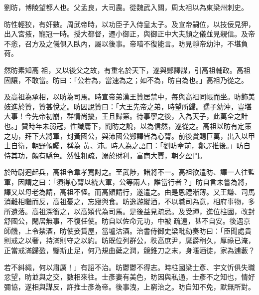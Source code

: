 
\begin{pinyinscope}

 劉昉，博陵望都人也。父孟良，大司農。從魏武入關，周太祖以為東梁州刺史。



 昉性輕狡，有奸數。周武帝時，以功臣子入侍皇太子。及宣帝嗣位，以技佞見狎，出入宮掖，寵冠一時。授大都督，遷小御正，與御正中大夫顏之儀並見親信。及帝不悆，召方及之儀俱入臥內，屬以後事。帝喑不復能言。昉見靜帝幼沖，不堪負荷。



 然昉素知高
 祖，又以後父之故，有重名於天下，遂與鄭譯謀，引高祖輔政。高祖固讓，不敢當。昉曰：「公若為，當速為之；如不為，昉自為也。」高祖乃從之。



 及高祖為承相，以昉為司馬。時宣帝弟漢王贊居禁中，每與高祖同帳而坐。昉飾美妓進於贊，贊甚悅之。昉因說贊曰：「大王先帝之弟，時望所歸。孺子幼沖，豈堪大事！今先帝初崩，群情尚擾，王且歸第。待事寧之後，入為天子，此萬全之計也。」贊時年未弱冠，性識庸下，聞昉之說，以為信然，遂從之。高祖以昉有定策之功，拜下大將軍，封黃國公，與沛國公鄭譯皆為心膂。前後賞賜巨萬，出入以甲士自衛，朝野傾矚，稱為
 黃、沛。時人為之語曰：「劉昉牽前，鄭譯推後。」昉自恃其功，頗有驕色。然性粗疏，溺於財利，富商大賈，朝夕盈門。



 於時尉迥起兵，高祖令韋孝寬討之。至武陟，諸將不一。高祖欲遣昉、譯一人往監軍，因謂之曰：「須得心膂以統大軍，公等兩人，誰當行者？」昉自言未嘗為將，譯又以母老為請，高祖不怪。而高熲請行，遂遣之。由是恩禮漸薄。又王謙、司馬消難相繼而反，高祖憂之，忘寢與食。昉逸游縱酒，不以職司為意，相府事物，多所遺落。高祖深銜之，以高熲代為司馬。是後益見疏忌。及受禪，進位柱國，改封舒國公，閑居無事，不復任使。昉自以佐命元功，中被
 疏遠，甚不自安。後遇京師饑，上令禁酒，昉使妾賃屋，當壚沽酒。治書侍御史梁毗劾奏昉曰：「臣聞處貴則戒之以奢，持滿則守之以約。昉既位列群公，秩高庶尹，縻爵稍久，厚祿已淹，正當戒滿歸盈，鑒斯止足，何乃規曲蘗之潤，競錐刀之末，身暱酒徒，家為逋藪？



 若不糾繩，何以肅厲！」有詔不治。昉鬱鬱不得志。時柱國梁士彥、宇文忻俱失職忿望，昉並與之交，數相來往。士彥妻有美色，昉因與私通，士彥不之知也，情好彌協，遂相與謀反，許推士彥為帝。後事洩，上窮治之。昉自知不免，默無所對。




\end{pinyinscope}
